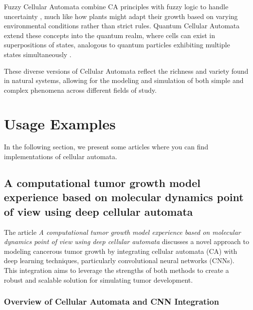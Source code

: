 \documentclass[9pt,a4paper,twoside]{tau-class/tau}
\begin{document}
Fuzzy Cellular Automata combine CA principles with fuzzy logic to handle uncertainty \cite{pedrycz2010}, much like how plants might adapt their growth based on varying environmental conditions rather than strict rules. Quantum Cellular Automata extend these concepts into the quantum realm, where cells can exist in superpositions of states, analogous to quantum particles exhibiting multiple states simultaneously \cite{brennen2003}.

These diverse versions of Cellular Automata reflect the richness and variety found in natural systems, allowing for the modeling and simulation of both simple and complex phenomena across different fields of study.



\section{Usage Examples}
In the following section, we present some articles where you can find implementations of cellular automata.

\subsection{ A computational tumor growth model experience based on molecular dynamics point of view using deep cellular automata }

The article \textit{A computational tumor growth model experience based on molecular dynamics point of view using deep cellular automata} discusses a novel approach to modeling cancerous tumor growth by integrating cellular automata (CA) with deep learning techniques, particularly convolutional neural networks (CNNs). This integration aims to leverage the strengths of both methods to create a robust and scalable solution for simulating tumor development.\cite{MATIN2024102752}

\subsubsection{Overview of Cellular Automata and CNN Integration}
\end{document}
